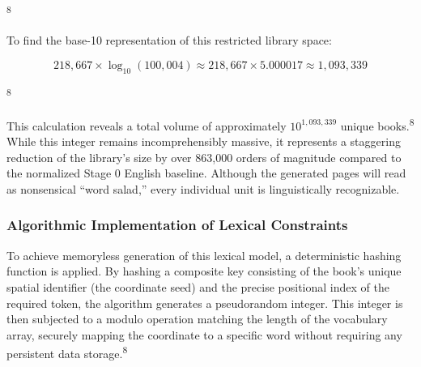 \documentclass[
  11pt,
  a4paper,
]{article}
\begin{document}
\textsuperscript{8}

To find the base-10 representation of this restricted library space:

\[
218,667 \times \log_{10}(100,004) \approx 218,667 \times 5.000017 \approx 1,093,339
\]

\textsuperscript{8}

This calculation reveals a total volume of approximately \(10^{1,093,339}\) unique books.\textsuperscript{8} While this integer remains incomprehensibly massive, it represents a staggering reduction of the library's size by over 863,000 orders of magnitude compared to the normalized Stage 0 English baseline. Although the generated pages will read as nonsensical ``word salad,'' every individual unit is linguistically recognizable.

\subsubsection{Algorithmic Implementation of Lexical Constraints}\label{algorithmic-implementation-of-lexical-constraints}

To achieve memoryless generation of this lexical model, a deterministic hashing function is applied. By hashing a composite key consisting of the book's unique spatial identifier (the coordinate seed) and the precise positional index of the required token, the algorithm generates a pseudorandom integer. This integer is then subjected to a modulo operation matching the length of the vocabulary array, securely mapping the coordinate to a specific word without requiring any persistent data storage.\textsuperscript{8}
\end{document}
